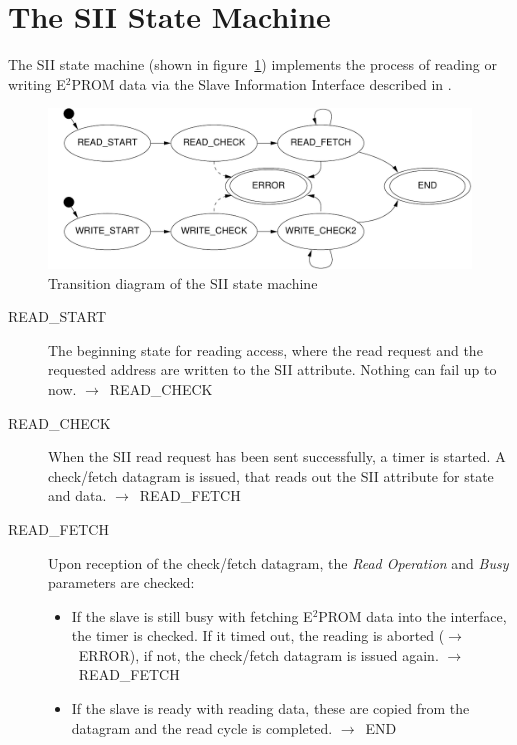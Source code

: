 \documentclass[a4paper,12pt,BCOR6mm,bibtotoc,idxtotoc]{scrbook}
\begin{document}

\section{The SII State Machine}
\label{sec:fsm-sii}

The SII state machine (shown in figure~\ref{fig:fsm-sii})
implements the process of reading or writing E$^2$PROM data via the
Slave Information Interface described in \cite[section~5.4]{alspec}.

\begin{figure}[htbp]
  \centering
  \includegraphics[width=.9\textwidth]{images/fsm-sii}
  \caption{Transition diagram of the SII state machine}
  \label{fig:fsm-sii}
\end{figure}

\begin{description}
\item[READ\_START] The beginning state for reading access, where the
  read request and the requested address are written to the SII
  attribute. Nothing can fail up to now.
  $\rightarrow$~READ\_CHECK

\item[READ\_CHECK] When the SII read request has been sent
  successfully, a timer is started. A check/fetch datagram is issued,
  that reads out the SII attribute for state and data.
  $\rightarrow$~READ\_FETCH

\item[READ\_FETCH] Upon reception of the check/fetch datagram, the
  \textit{Read Operation} and \textit{Busy} parameters are checked:
  \begin{itemize}
  \item If the slave is still busy with fetching E$^2$PROM data into
    the interface, the timer is checked. If it timed out, the reading
    is aborted ($\rightarrow$~ERROR), if not, the check/fetch datagram
    is issued again. $\rightarrow$~READ\_FETCH

  \item If the slave is ready with reading data, these are copied from
    the datagram and the read cycle is completed.
    $\rightarrow$~END
  \end{itemize}
\end{description}
\end{document}
